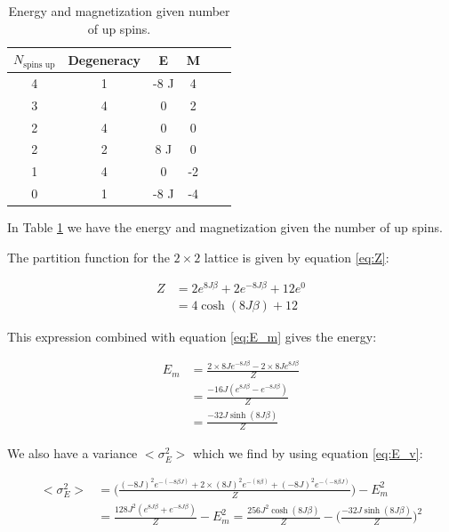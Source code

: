 \documentclass{article}
\begin{document}
\begin{table}[H]
\begin{center}
\caption{Energy and magnetization given number of up spins.}
\begin{tabular}{  |c|c|c|c|c|c| } \hline
$N_{\text{spins up}}$&Degeneracy&E&M \\ \hline
4&1&-8 J&4\\ \hline
3&4&0 &2 \\ \hline
2&4&0&0\\ \hline
2&2&8 J&0\\ \hline
1&4&0&-2\\ \hline
0&1&-8 J&-4\\ \hline
\end{tabular}
\label{tab:up_spins}
\end{center}
\end{table}

In Table \ref{tab:up_spins} we have the energy and magnetization given the number of up spins. 

The partition function for the $2\times2$ lattice is given by equation \ref{eq:Z}:

\begin{equation}
\begin{split}
Z&=2e^{8J\beta}+2e^{-8J\beta}+12e^0\\
&=4\cosh{(8J\beta)}+12
\end{split}
\label{eq:calc_Z}
\end{equation}

This expression combined with equation \ref{eq:E_m} gives the energy:

\begin{equation}
\begin{split}
E_m &= \frac{2\times8Je^{-8J\beta}-2\times8Je^{8J\beta}}{Z}\\
&=\frac{-16J(e^{8J\beta}-e^{-8J\beta})}{Z}\\
&=\frac{-32J\sinh{(8J\beta)}}{Z}
\label{eq:calc_E}
\end{split}
\end{equation}

We also have a variance $<\sigma_E^2>$ which we find by using equation \ref{eq:E_v}:

\begin{equation}
\begin{split}
<\sigma_E^2>&=\bigg(\frac{(-8J)^2e^{-(-8\beta J)} + 2 \times (8J)^2e^{-(8\beta)}+(-8J)^2e^{-(-8\beta J)}}{Z}\bigg)-E_m^2\\
&=\frac{128J^2(e^{8J\beta}+e^{-8J\beta})}{Z}-E_m^2=\frac{256J^2\cosh{(8J\beta)}}{Z}-\bigg(\frac{-32J\sinh{(8J\beta)}}{Z}\bigg)^2
\label{eq:calc_Ev}
\end{split}
\end{equation}
\end{document}
